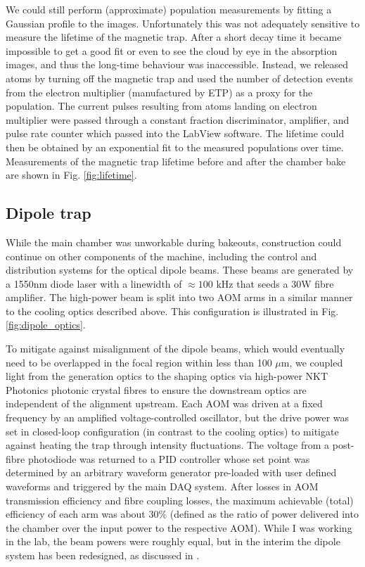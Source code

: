 	We could still perform (approximate) population measurements by fitting a Gaussian profile to the images.
	Unfortunately this was not adequately sensitive to measure the lifetime of the magnetic trap.
	After a short decay time it became impossible to get a good fit or even to see the cloud by eye in the absorption images, and thus the long-time behaviour was inaccessible.
	Instead, we released atoms by turning off the magnetic trap and used the number of detection events from the electron multiplier (manufactured by ETP) as a proxy for the population. 
	The current pulses resulting from atoms landing on electron multiplier were passed through a constant fraction discriminator, amplifier, and pulse rate counter which passed into the LabView software.
	The lifetime could then be obtained by an exponential fit to the measured populations over time.
	Measurements of the magnetic trap lifetime before and after the chamber bake are shown in Fig. \ref{fig:lifetime}.


	
	

\subsection{Dipole trap}
	While the main chamber was unworkable during bakeouts, construction could continue on other components of the machine, including the control and distribution systems for the optical dipole beams.
	These beams are generated by a 1550nm diode laser with a linewidth of $\approx100$ kHz that seeds a 30W fibre amplifier.
	The high-power beam is split into two AOM arms in a similar manner to the cooling optics described above.
	This configuration is illustrated  in Fig.	\ref{fig:dipole_optics}.
	
	To mitigate against misalignment of the dipole beams, which would eventually need to be overlapped in the focal region within less than 100 $\mu$m, we coupled light from the generation optics to the shaping optics via high-power NKT Photonics photonic crystal fibres to ensure the downstream optics are independent of the alignment upstream.
	Each AOM was driven at a fixed frequency by an amplified voltage-controlled oscillator, but the drive power was set in closed-loop configuration (in contrast to the cooling optics) to mitigate against heating the trap through intensity fluctuations.
	The voltage from a post-fibre photodiode was returned to a PID controller whose set point was determined by an arbitrary waveform generator pre-loaded with user defined waveforms and triggered by the main DAQ system.
	After losses in AOM transmission efficiency and fibre coupling losses, the maximum achievable (total) efficiency of each arm was about 30\% (defined as the ratio of power delivered into the chamber over the input power to the respective AOM).
	While I was working in the lab, the beam powers were roughly equal, but in the interim the dipole system has been redesigned, as discussed in \cite{Abbas21}.

